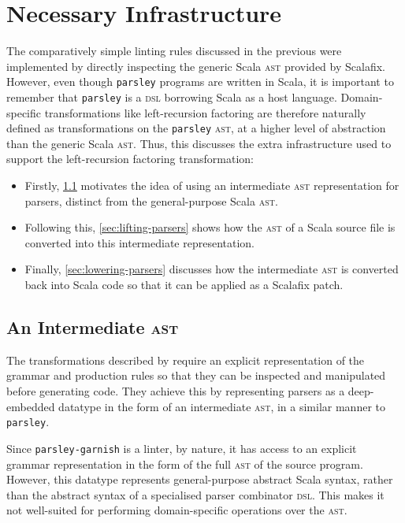 \documentclass[../../main.tex]{subfiles}
\begin{document}
\section{Necessary Infrastructure}\label{sec:leftrec-infra}
The comparatively simple linting rules discussed in the previous  were implemented by directly inspecting the generic Scala \textsc{ast} provided by Scalafix.
However, even though \texttt{parsley} programs are written in Scala, it is important to remember that \texttt{parsley} is a \textsc{dsl} borrowing Scala as a host language.
Domain-specific transformations like left-recursion factoring are therefore naturally defined as transformations on the \texttt{parsley} \textsc{ast}, at a higher level of abstraction than the generic Scala \textsc{ast}.
Thus, this  discusses the extra infrastructure used to support the left-recursion factoring transformation:
\begin{itemize}
  \item Firstly, \cref{sec:parser-ast-motivation} motivates the idea of using an intermediate \textsc{ast} representation for parsers, distinct from the general-purpose Scala \textsc{ast}.
  \item Following this, \cref{sec:lifting-parsers} shows how the \textsc{ast} of a Scala source file is converted into this intermediate representation.
  \item Finally, \cref{sec:lowering-parsers} discusses how the intermediate \textsc{ast} is converted back into Scala code so that it can be applied as a Scalafix patch.
\end{itemize}

\subsection{An Intermediate \textsc{ast}}\label{sec:parser-ast-motivation}
The transformations described by \textcite{baars_leftrec_2004} require an explicit representation of the grammar and production rules so that they can be inspected and manipulated before generating code.
They achieve this by representing parsers as a deep-embedded datatype in the form of an intermediate \textsc{ast}, in a similar manner to \texttt{parsley}.

Since \texttt{parsley-garnish} is a linter, by nature, it has access to an explicit grammar representation in the form of the full  \textsc{ast} of the source program.
However, this datatype represents general-purpose abstract Scala syntax, rather than the abstract syntax of a specialised parser combinator \textsc{dsl}.
This makes it not well-suited for performing domain-specific operations over the \textsc{ast}.
\end{document}
